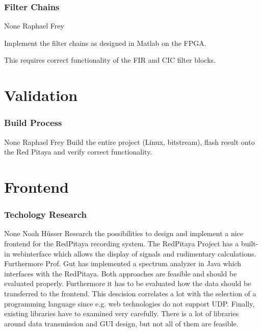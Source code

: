 \documentclass[a4paper,oneside]{alpenspecs/alpenspecs}
\begin{document}
\subsubsection{Filter Chains}
\label{subsubsec:fw:fpga:filters}
\wpac
     {}
     {}
     {}
     {None}
     {}
     {Raphael Frey}
     {%
         Implement the filter chains as designed in Matlab on the FPGA.

         This requires correct functionality of the FIR and CIC filter
         blocks.
     }


\section{Validation}
\label{sec:validation}

\subsubsection{Build Process}
\label{subsec:validation:build}
\wpac
     {}
     {}
     {}
     {None}
     {}
     {Raphael Frey}
     {%
         Build the entire project (Linux, bitstream), flash
         result onto the Red Pitaya and verify correct functionality.
     }

\section{Frontend}
\label{sec:frontend}

\subsubsection{Techology Research}
\label{subsec:frontend:}
\wpac
     {}
     {}
     {}
     {None}
     {}
     {Noah Hüsser}
     {%
         Research the possibilities to design and implement a nice frontend for the RedPitaya recording system.
         The RedPitaya Project has a built-in webinterface which allows the display of signals and rudimentary calculations.
         Furthermore Prof. Gut has implemented a spectrum analyzer in Java which interfaces with the RedPitaya.
         Both approaches are feasible and should be evaluated properly.
         Furthermore it has to be evaluated how the data should be transferred to the frontend.
         This descision correlates a lot with the selection of a programming language since e.g. web technologies do not support UDP.
         Finally, existing libraries have to examined very carefully. There is a lot of libraries around data transmission and GUI design, but not all of them are feasible.
     }
\end{document}
